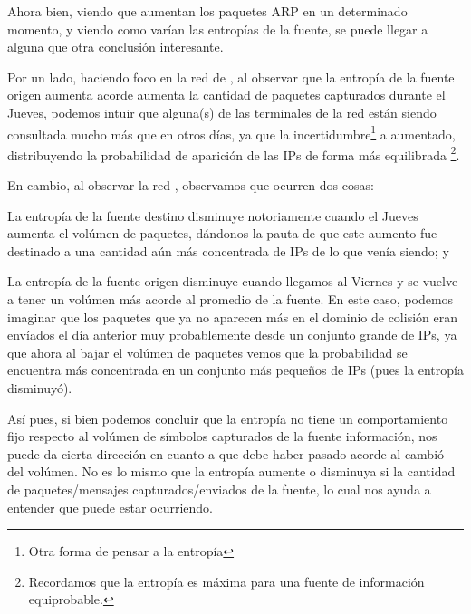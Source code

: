 \par Ahora bien, viendo que aumentan los paquetes ARP en un determinado momento,
y viendo como var\'ian las entrop\'ias de la fuente, se puede llegar a alguna
que otra conclusi\'on interesante.

\par Por un lado, haciendo foco en la red de , al observar
que la entrop\'ia de la fuente origen aumenta acorde aumenta la cantidad
de paquetes capturados durante el Jueves, podemos intuir que alguna(s)
de las terminales de la red est\'an siendo consultada mucho m\'as que en otros d\'ias,
ya que la incertidumbre\footnote{Otra forma de pensar a la entrop\'ia} a aumentado,
distribuyendo la probabilidad de aparici\'on de las IPs de forma m\'as equilibrada%
\footnote{Recordamos que la entrop\'ia es m\'axima para una fuente de informaci\'on
equiprobable.}.

\par En cambio, al observar la red , observamos que ocurren
dos cosas:
\begin{enumerate*}[label=\itshape\alph*\upshape)]
    \item La entrop\'ia de la fuente destino disminuye notoriamente cuando el Jueves
    aumenta el vol\'umen de paquetes, d\'andonos la pauta de que este aumento fue
    destinado a una cantidad a\'un m\'as concentrada de IPs de lo que ven\'ia siendo; y

    \item La entrop\'ia de la fuente origen disminuye cuando llegamos al Viernes
    y se vuelve a tener un vol\'umen m\'as acorde al promedio de la fuente. En este
    caso, podemos imaginar que los paquetes que ya no aparecen m\'as en el dominio
    de colisi\'on eran env\'iados el d\'ia anterior muy probablemente desde un conjunto grande
    de IPs, ya que ahora al bajar el vol\'umen de paquetes vemos que la probabilidad
    se encuentra m\'as concentrada en un conjunto m\'as peque\~nos de IPs (pues la
    entrop\'ia disminuy\'o).
\end{enumerate*}

\par As\'i pues, si bien podemos concluir que la entrop\'ia no tiene un comportamiento
fijo respecto al vol\'umen de s\'imbolos capturados de la fuente informaci\'on, nos
puede da cierta direcci\'on en cuanto a que debe haber pasado acorde al cambi\'o del
vol\'umen. No es lo mismo que la entrop\'ia aumente o disminuya si la cantidad de
paquetes/mensajes capturados/enviados de la fuente, lo cual nos
ayuda a entender que puede estar ocurriendo.
